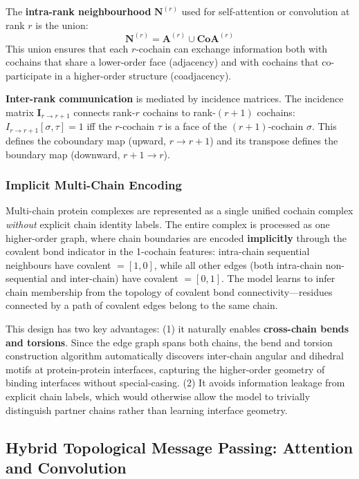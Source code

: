 \documentclass{article}
\begin{document}
The \textbf{intra-rank neighbourhood} $\mathbf{N}^{(r)}$ used for self-attention or convolution at rank $r$ is the union:
\begin{equation}
    \mathbf{N}^{(r)} = \mathbf{A}^{(r)} \cup \mathbf{CoA}^{(r)}
\end{equation}
This union ensures that each $r$-cochain can exchange information both with cochains that share a lower-order face (adjacency) and with cochains that co-participate in a higher-order structure (coadjacency).

\textbf{Inter-rank communication} is mediated by incidence matrices. The incidence matrix $\mathbf{I}_{r \to r+1}$ connects rank-$r$ cochains to rank-$(r{+}1)$ cochains: $I_{r \to r+1}[\sigma, \tau] = 1$ iff the $r$-cochain $\tau$ is a face of the $(r{+}1)$-cochain $\sigma$. This defines the coboundary map (upward, $r \to r{+}1$) and its transpose defines the boundary map (downward, $r{+}1 \to r$).

\subsubsection{Implicit Multi-Chain Encoding}
\label{sec:implicit_multichain}

Multi-chain protein complexes are represented as a single unified cochain complex \emph{without} explicit chain identity labels. The entire complex is processed as one higher-order graph, where chain boundaries are encoded \textbf{implicitly} through the covalent bond indicator in the 1-cochain features: intra-chain sequential neighbours have covalent $= [1, 0]$, while all other edges (both intra-chain non-sequential and inter-chain) have covalent $= [0, 1]$. The model learns to infer chain membership from the topology of covalent bond connectivity---residues connected by a path of covalent edges belong to the same chain.

This design has two key advantages: (1) it naturally enables \textbf{cross-chain bends and torsions}. Since the edge graph spans both chains, the bend and torsion construction algorithm automatically discovers inter-chain angular and dihedral motifs at protein-protein interfaces, capturing the higher-order geometry of binding interfaces without special-casing. (2) It avoids information leakage from explicit chain labels, which would otherwise allow the model to trivially distinguish partner chains rather than learning interface geometry.

\subsection{Hybrid Topological Message Passing: Attention and Convolution}
\end{document}
